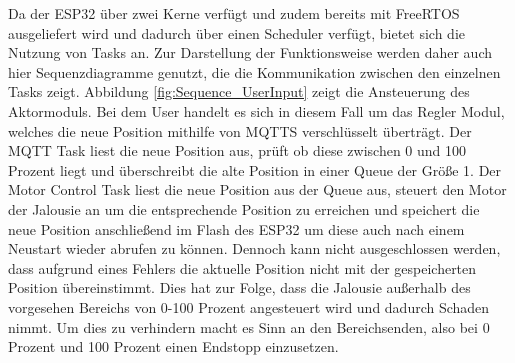 Da der ESP32 über zwei Kerne verfügt und zudem bereits mit FreeRTOS ausgeliefert wird und dadurch über einen Scheduler verfügt, bietet sich die Nutzung von Tasks an. Zur Darstellung der Funktionsweise werden daher auch hier Sequenzdiagramme genutzt, die die Kommunikation zwischen den einzelnen Tasks zeigt. Abbildung \ref{fig:Sequence_UserInput} zeigt die Ansteuerung des Aktormoduls. Bei dem User handelt es sich in diesem Fall um das Regler Modul, welches die neue Position mithilfe von MQTTS verschlüsselt überträgt. Der MQTT Task liest die neue Position aus, prüft ob diese zwischen 0 und 100 Prozent liegt und überschreibt die alte Position in einer Queue der Größe 1. Der Motor Control Task liest die neue Position aus der Queue aus, steuert den Motor der Jalousie an um die entsprechende Position zu erreichen und speichert die neue Position anschließend im Flash des ESP32 um diese auch nach einem Neustart wieder abrufen zu können. Dennoch kann nicht ausgeschlossen werden, dass aufgrund eines Fehlers die aktuelle Position nicht mit der gespeicherten Position übereinstimmt. Dies hat zur Folge, dass die Jalousie außerhalb des vorgesehen Bereichs von 0-100 Prozent angesteuert wird und dadurch Schaden nimmt. Um dies zu verhindern macht es Sinn an den Bereichsenden, also bei 0 Prozent und 100 Prozent einen Endstopp einzusetzen.
